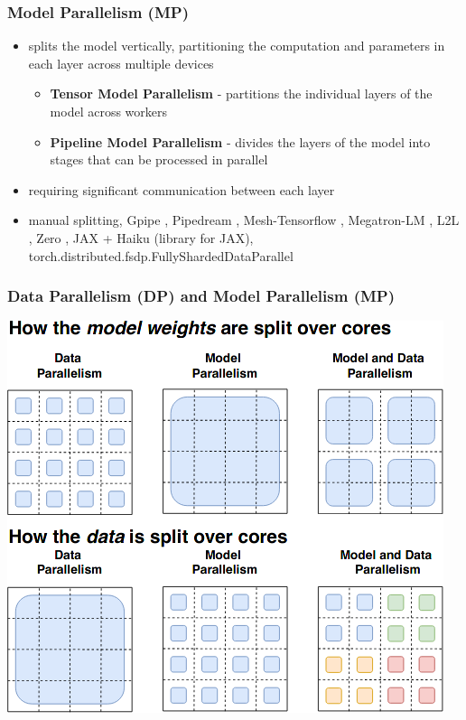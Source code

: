 \documentclass{beamer}
\begin{document}
\begin{frame}
    \frametitle{Model Parallelism (MP)}
    \begin{itemize}
        \item splits the model vertically, partitioning the computation and parameters in each layer across multiple devices
        \begin{itemize}
        \item \textbf{Tensor Model Parallelism} - partitions the individual layers of the model across workers
        \item \textbf{Pipeline Model Parallelism} - divides the layers of the model into stages that can be processed in parallel
        \end{itemize}
        \item requiring significant communication between each layer
        \item manual splitting, Gpipe \cite{gpipe}, Pipedream \cite{pipedream}, Mesh-Tensorflow \cite{mesh_tensorflow}, Megatron-LM \cite{megatronlm} \cite{megatronlm_2}, L2L \cite{l2l}, Zero \cite{zero} \cite{zero_offload} \cite{zero_infinity}, JAX \cite{jax} + Haiku \cite{jax_haiku} (library for JAX), torch.distributed.fsdp.FullyShardedDataParallel \cite{blog_torch_fsdp}
    \end{itemize}
\end{frame}

\begin{frame}
    \frametitle{Data Parallelism (DP) and Model Parallelism (MP)}
    \begin{center}
        \includegraphics[scale=0.42]{img/data_distribution.png}
    \end{center}
\end{frame}
\end{document}
